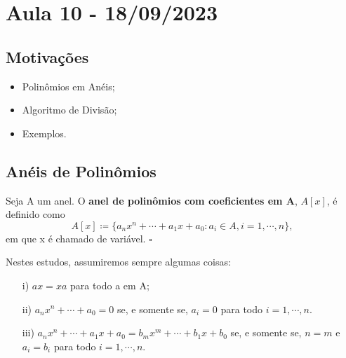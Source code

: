 \documentclass[AlgebraII/algebraII_notes.tex]{subfiles}
\begin{document}
\section{Aula 10 - 18/09/2023}
\subsection{Motivações}
\begin{itemize}
	\item Polinômios em Anéis;
	\item Algoritmo de Divisão;
	\item Exemplos.
\end{itemize}
\subsection{Anéis de Polinômios}
\begin{def*}
	Seja A um anel. O \textbf{anel de polinômios com coeficientes em A}, \(A[x]\), é definido como
	\[
		A[x]\coloneqq \{a_{n}x^{n}+\cdots+a_{1}x + a_{0}: a_{i}\in A, i = 1, \cdots, n\},
	\]
	em que x é chamado de variável. \(\square\)
\end{def*}
Nestes estudos, assumiremos sempre algumas coisas:
\begin{itemize}
	\item[i)] \(ax = xa\) para todo a em A;
	\item[ii)] \(a_{n}x^{n} + \cdots + a_{0} = 0\) se, e somente se, \(a_{i} = 0\) para todo \(i=1, \cdots, n.\)
	\item[iii)] \(a_{n}x^{n} + \cdots + a_{1}x + a_{0} = b_{m}x^{m} + \cdots + b_{1}x + b_{0}\) se, e somente se, \(n=m\) e \(a_{i} = b_{i}\) para todo \(i=1, \cdots, n\).
\end{itemize}
\end{document}
